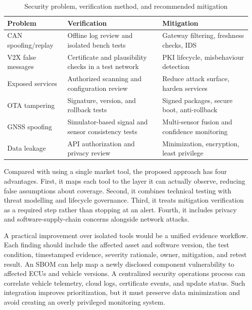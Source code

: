 \documentclass[11pt]{article}
\begin{document}
\begin{table}[t]
\centering
\caption{Security problem, verification method, and recommended mitigation}
\small
\begin{tabularx}{\columnwidth}{p{1.7cm}p{2.1cm}X}
\toprule
\textbf{Problem} & \textbf{Verification} & \textbf{Mitigation}\\
\midrule
CAN spoofing/replay & Offline log review and isolated bench tests & Gateway filtering, freshness checks, IDS\\
V2X false messages & Certificate and plausibility checks in a test network & PKI lifecycle, misbehaviour detection\\
Exposed services & Authorized scanning and configuration review & Reduce attack surface, harden services\\
OTA tampering & Signature, version, and rollback tests & Signed packages, secure boot, anti-rollback\\
GNSS spoofing & Simulator-based signal and sensor consistency tests & Multi-sensor fusion and confidence monitoring\\
Data leakage & API authorization and privacy review & Minimization, encryption, least privilege\\
\bottomrule
\end{tabularx}
\end{table}

Compared with using a single market tool, the proposed approach has four advantages. First, it maps each tool to the layer it can actually observe, reducing false assumptions about coverage. Second, it combines technical testing with threat modelling and lifecycle governance. Third, it treats mitigation verification as a required step rather than stopping at an alert. Fourth, it includes privacy and software-supply-chain concerns alongside network attacks.

A practical improvement over isolated tools would be a unified evidence workflow. Each finding should include the affected asset and software version, the test condition, timestamped evidence, severity rationale, owner, mitigation, and retest result. An SBOM can help map a newly disclosed component vulnerability to affected ECUs and vehicle versions. A centralized security operations process can correlate vehicle telemetry, cloud logs, certificate events, and update status. Such integration improves prioritization, but it must preserve data minimization and avoid creating an overly privileged monitoring system.
\end{document}
